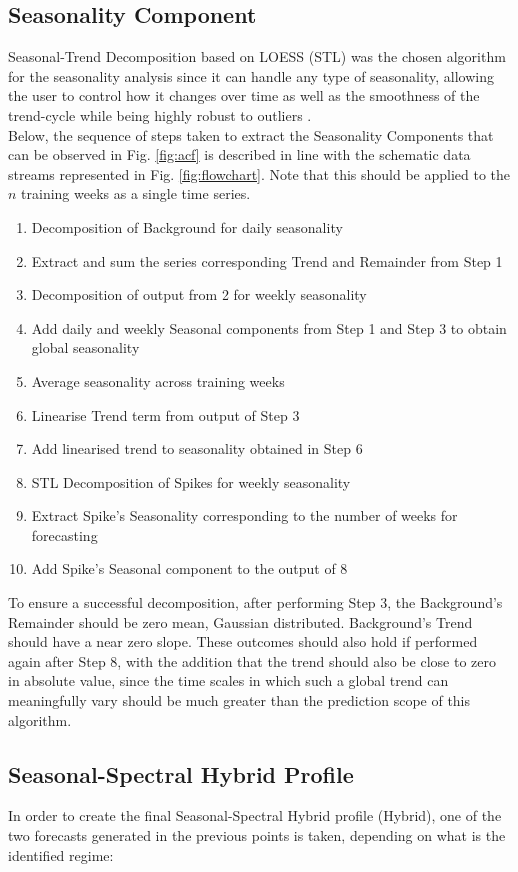 \documentclass[letterpaper, 10 pt, conference]{ieeeconf}  %
\begin{document}
\subsection{Seasonality Component}
Seasonal-Trend Decomposition based on LOESS (STL) \cite{STL} was the chosen algorithm for the seasonality analysis since it can handle any type of seasonality, allowing the user to control how it changes over time as well as the smoothness of the trend-cycle while being highly robust to outliers \cite{forecasting}.\\

Below, the sequence of steps taken to extract the Seasonality Components that can be observed in Fig. \ref{fig:acf} is described in line with the schematic data streams represented in Fig. \ref{fig:flowchart}. 
Note that this should be applied to the $n$ training weeks as a single time series.
\begin{enumerate}
	\item Decomposition of Background for daily seasonality
	\item Extract and sum the series corresponding Trend and Remainder from Step 1
	\item Decomposition of output from 2 for weekly seasonality
	\item Add daily and weekly Seasonal components from Step 1 and Step 3 to obtain global seasonality
	\item Average seasonality across training weeks
	\item Linearise Trend term from output of Step 3
	\item Add linearised trend to seasonality obtained in Step 6
	\item STL Decomposition of Spikes for weekly seasonality
	\item Extract Spike's Seasonality corresponding to the number of weeks for forecasting
	\item Add Spike's Seasonal component to the output of 8
\end{enumerate}
To ensure a successful decomposition, after performing Step 3, the Background's Remainder should be zero mean, Gaussian distributed. Background's Trend should have a near zero slope. These outcomes should also hold if performed again after Step 8, with the addition that the trend should also be close to zero in absolute value, since the time scales in which such a global trend can meaningfully vary should be much greater than the prediction scope of this algorithm.
\subsection{Seasonal-Spectral Hybrid Profile}
In order to create the final Seasonal-Spectral Hybrid profile (Hybrid), one of the two forecasts generated in the previous points is taken, depending on what is the identified regime: 
\end{document}
